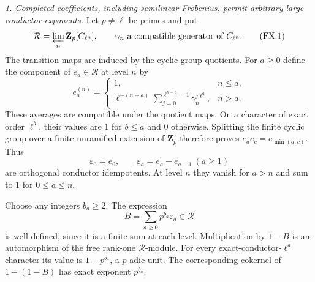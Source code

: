 \documentclass[11pt,a4paper]{article}
\begin{document}
\emph{1. Completed coefficients, including semilinear Frobenius, permit
arbitrary large conductor exponents.}
Let $p\ne\ell$ be primes and put
\[
 \mathcal R=\varprojlim_n\mathbf Z_p[C_{\ell^n}],
 \qquad \gamma_n\text{ a compatible generator of }C_{\ell^n}.
 \tag{FX.1}
\]
The transition maps are induced by the cyclic-group quotients.
For $a\ge0$ define the component of $e_a\in\mathcal R$ at level $n$ by
\[
 e_a^{(n)}=
 \begin{cases}
 1,&n\le a,\\[1mm]
 \displaystyle\ell^{-(n-a)}
       \sum_{j=0}^{\ell^{n-a}-1}\gamma_n^{j\ell^a},&n>a.
 \end{cases}
 \tag{FX.2}
\]
These averages are compatible under the quotient maps. On a character
of exact order $\ell^b$, their values are $1$ for $b\le a$ and $0$
otherwise. Splitting the finite cyclic group over a finite unramified
extension of $\mathbf Z_p$ therefore proves
$e_ae_c=e_{\min(a,c)}$. Thus
\[
 \varepsilon_0=e_0,\qquad \varepsilon_a=e_a-e_{a-1}\ (a\ge1)
 \tag{FX.3}
\]
are orthogonal conductor idempotents. At level $n$ they vanish for
$a>n$ and sum to $1$ for $0\le a\le n$.

Choose any integers $b_a\ge2$. The expression
\[
 B=\sum_{a\ge0}p^{b_a}\varepsilon_a\in\mathcal R
 \tag{FX.4}
\]
is well defined, since it is a finite sum at each level. Multiplication
by $1-B$ is an automorphism of the free rank-one $\mathcal R$-module.
For every exact-conductor-$\ell^a$ character its value is
$1-p^{b_a}$, a $p$-adic unit. The corresponding cokernel of
$1-(1-B)$ has exact exponent $p^{b_a}$.
\end{document}

